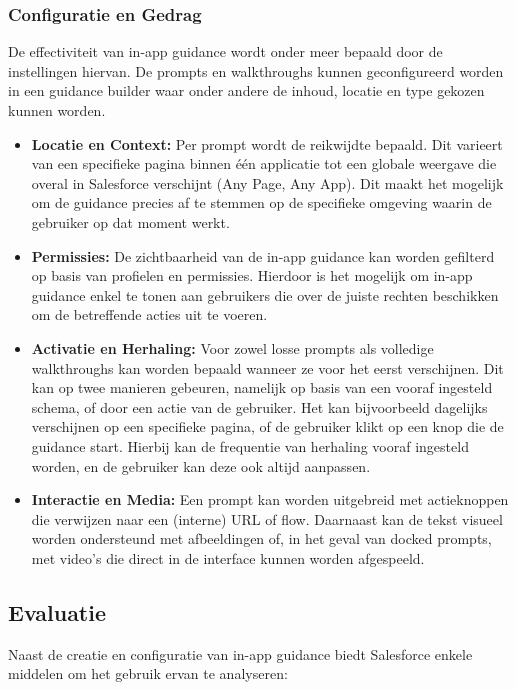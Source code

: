 \subsubsection{Configuratie en Gedrag}
De effectiviteit van in-app guidance wordt onder meer bepaald door de instellingen hiervan. De prompts en walkthroughs kunnen geconfigureerd worden in een guidance builder waar onder andere de inhoud, locatie en type gekozen kunnen worden.

\begin{itemize}
	\item \textbf{Locatie en Context:} Per prompt wordt de reikwijdte bepaald. Dit varieert van een specifieke pagina binnen één applicatie tot een globale weergave die overal in Salesforce verschijnt (Any Page, Any App). Dit maakt het mogelijk om de guidance precies af te stemmen op de specifieke omgeving waarin de gebruiker op dat moment werkt.
	
	\item \textbf{Permissies:} De zichtbaarheid van de in-app guidance kan worden gefilterd op basis van profielen en permissies. Hierdoor is het mogelijk om in-app guidance enkel te tonen aan gebruikers die over de juiste rechten beschikken om de betreffende acties uit te voeren.
	
	\item \textbf{Activatie en Herhaling:} Voor zowel losse prompts als volledige walkthroughs kan worden bepaald wanneer ze voor het eerst verschijnen. Dit kan op twee manieren gebeuren, namelijk op basis van een vooraf ingesteld schema, of door een actie van de gebruiker. Het kan bijvoorbeeld dagelijks verschijnen op een specifieke pagina, of de gebruiker klikt op een knop die de guidance start. Hierbij kan de frequentie van herhaling vooraf ingesteld worden, en de gebruiker kan deze ook altijd aanpassen.
	
	\item \textbf{Interactie en Media:} Een prompt kan worden uitgebreid met actieknoppen die verwijzen naar een (interne) URL of flow. Daarnaast kan de tekst visueel worden ondersteund met afbeeldingen of, in het geval van docked prompts, met video's die direct in de interface kunnen worden afgespeeld.
\end{itemize}

\subsection{Evaluatie}
Naast de creatie en configuratie van in-app guidance biedt Salesforce enkele middelen om het gebruik ervan te analyseren:

